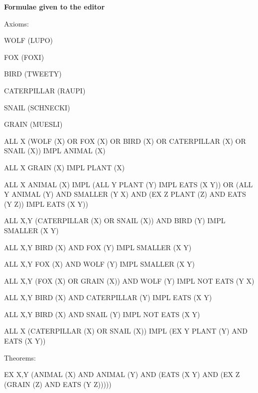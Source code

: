 \newlength{\premisewidth}
\newlength{\namelength}
\newlength{\usedsignlength}
\newlength{\implsignlength}
\newlength{\remainlength}
\def\implication#1#2#3#4{%
\settowidth{\premisewidth}{#1}
\setlength{\remainlength}{\textwidth}
\settowidth{\usedsignlength}{* }
\settowidth{\implsignlength}{#4}
\settowidth{\namelength}{mmmm}
\addtolength{\remainlength}{-0.5cm}
\addtolength{\remainlength}{-1\premisewidth}
\addtolength{\remainlength}{-1\namelength}
\addtolength{\remainlength}{-1\usedsignlength}
\addtolength{\remainlength}{-1\implsignlength}
\hbox to \hsize{\parbox[t]{\premisewidth}{#2} \hfil \parbox[t]{\implsignlength}{#4} \hfil #3}}




             {\bf Formulae given to the editor}

   
\parbox[t]{2cm}{Axioms:}\hfill 
\setlength{\remainlength}{\textwidth}
\addtolength{\remainlength}{-2.5cm}
\parbox[t]{\remainlength}{WOLF (LUPO)

             FOX (FOXI)

             BIRD (TWEETY)

             CATERPILLAR (RAUPI)

             SNAIL (SCHNECKI)

             GRAIN (MUESLI)

             ALL X (WOLF (X) OR FOX (X) OR BIRD (X) OR CATERPILLAR (X) OR SNAIL (X)) IMPL ANIMAL (X)

             ALL X GRAIN (X) IMPL PLANT (X)

             ALL X ANIMAL (X)
                   IMPL (ALL Y PLANT (Y) IMPL EATS (X Y))
                        OR (ALL Y ANIMAL (Y) AND SMALLER (Y X) AND (EX Z PLANT (Z) AND EATS (Y Z)) IMPL EATS (X Y))

             ALL X,Y (CATERPILLAR (X) OR SNAIL (X)) AND BIRD (Y) IMPL SMALLER (X Y)

             ALL X,Y BIRD (X) AND FOX (Y) IMPL SMALLER (X Y)

             ALL X,Y FOX (X) AND WOLF (Y) IMPL SMALLER (X Y)

             ALL X,Y (FOX (X) OR GRAIN (X)) AND WOLF (Y) IMPL NOT EATS (Y X)

             ALL X,Y BIRD (X) AND CATERPILLAR (Y) IMPL EATS (X Y)

             ALL X,Y BIRD (X) AND SNAIL (Y) IMPL NOT EATS (X Y)

             ALL X (CATERPILLAR (X) OR SNAIL (X)) IMPL (EX Y PLANT (Y) AND EATS (X Y))

             
}
\parbox[t]{2cm}{Theorems:}\hfill 
\setlength{\remainlength}{\textwidth}
\addtolength{\remainlength}{-2.5cm}
\parbox[t]{\remainlength}{EX X,Y (ANIMAL (X) AND ANIMAL (Y) AND (EATS (X Y) AND (EX Z (GRAIN (Z) AND EATS (Y Z)))))

             
}


